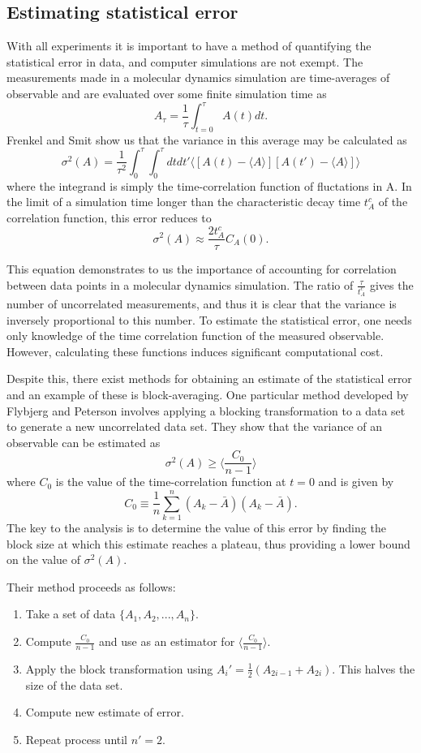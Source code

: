 \subsection{Estimating statistical error}
With all experiments it is important to have a method of quantifying the statistical error in data, and computer simulations are not exempt.
The measurements made in a molecular dynamics simulation are time-averages of observable and are evaluated over some finite simulation time as
$$A_{\tau} = \frac{1}{\tau} \int_{t=0}^{\tau} A(t) dt.$$
Frenkel and Smit show us that the variance in this average may be calculated as 
$$\sigma^{2}(A) = \frac{1}{\tau^{2}} \int_{0}^{\tau} \int_{0}^{\tau} dt dt' \big \langle [ A(t) - \langle A \rangle ] [A(t') - \langle A \rangle] \big \rangle$$
where the integrand is simply the time-correlation function of fluctations in A\cite{FrenkelSmit}.
In the limit of a simulation time longer than the characteristic decay time $t_{A}^c$ of the correlation function, this error reduces to 
$$\sigma^{2}(A) \approx \frac{2t^{c}_{A}}{\tau}C_{A}(0).$$

This equation demonstrates to us the importance of accounting for correlation between data points in a molecular dynamics simulation. 
The ratio of $\frac{\tau}{t_{A}^{c}}$ gives the number of uncorrelated measurements, and thus it is clear that the variance is inversely proportional to this number.
To estimate the statistical error, one needs only knowledge of the time correlation function of the measured observable.
However, calculating these functions induces significant computational cost.

Despite this, there exist methods for obtaining an estimate of the statistical error and an example of these is block-averaging.
One particular method developed by Flybjerg and Peterson involves applying a blocking transformation to a data set to generate a new uncorrelated data set\cite{Flyvbjerg1989}.
They show that the variance of an observable can be estimated as
$$\sigma^{2}(A) \geq \bigg \langle \frac{C_{0}}{n-1} \bigg \rangle$$
where $C_{0}$ is the value of the time-correlation function at $t=0$ and is given by
$$C_{0} \equiv \frac{1}{n} \sum_{k=1}^{n}(A_{k} - \bar{A})(A_{k} - \bar{A}).$$
The key to the analysis is to determine the value of this error by finding the block size at which this estimate reaches a plateau, thus providing a lower bound on the value of $\sigma^{2}(A)$. 

Their method proceeds as follows:
\begin{enumerate}
 \item Take a set of data $\{A_{1},A_{2},...,A_{n}\}$.
 \item Compute $\frac{C_{0}}{n-1}$ and use as an estimator for $\big \langle \frac{C_{0}}{n-1} \big \rangle$.
 \item Apply the block transformation using
	$A_{i}' = \frac{1}{2} (A_{2i-1} + A_{2i}).$
	This halves the size of the data set.
 \item Compute new estimate of error.
 \item Repeat process until $n' = 2$.
\end{enumerate}

